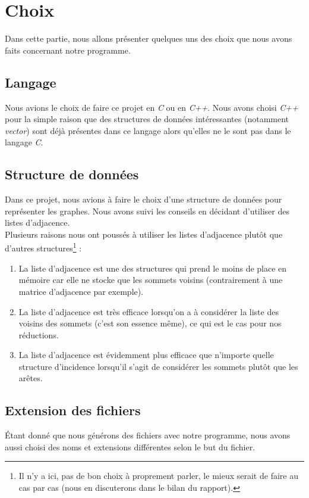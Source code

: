  \section{Choix}
 Dans cette partie, nous allons présenter quelques uns des choix que
 nous avons faits concernant notre programme.

  \subsection{Langage}
  Nous avions le choix de faire ce projet en \emph{C} ou en
  \emph{C++}. Nous avons choisi \emph{C++} pour la simple raison que des
  structures de données intéressantes (notamment \emph{vector}) sont
  déjà présentes dans ce langage alors qu'elles ne le sont pas dans le
  langage \emph{C}.
  
  \subsection{Structure de données}
  Dans ce projet, nous avions à faire le choix d'une structure de
  données pour représenter les graphes. Nous avons suivi les conseils en
  décidant d'utiliser des listes d'adjacence.\\

  Plusieurs raisons nous ont poussés à utiliser les listes d'adjacence
  plutôt que d'autres structures\footnote{Il n'y a ici, pas de bon choix
  à proprement parler, le mieux serait de faire au cas par cas (nous en
  discuterons dans le bilan du rapport).} :
  \begin{enumerate}
   \item La liste d'adjacence est une des structures qui prend le moins
	 de place en mémoire car elle ne stocke que les sommets voisins
	 (contrairement à une matrice d'adjacence par exemple).
   \item La liste d'adjacence est très efficace lorsqu'on a à
	 considérer la liste des voisins des sommets (c'est son essence
	 même), ce qui est le cas pour nos réductions.
   \item La liste d'adjacence est évidemment plus efficace que n'importe
	 quelle structure d'incidence lorsqu'il s'agit de considérer les
	 sommets plutôt que les arêtes.
  \end{enumerate}

  

  \subsection{Extension des fichiers}
  Étant donné que nous générons des fichiers avec notre programme, nous
  avons aussi choisi des noms et extensions différentes selon le but du
  fichier.\\


